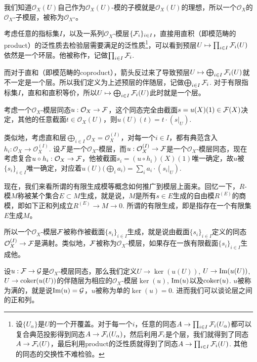 我们知道$\mathcal{O}_X(U)$自己作为$\mathcal{O}_X(U)$-模的子模就是$\mathcal{O}_X(U)$的理想，所以一个$\mathcal{O}_X$的$\mathcal{O}_X$-子模层，被称为$\mathcal{O}_X$-。

\para 考虑任意的指标集$I$，以及一系列$\mathcal{O}_X$-模层$\{\mathcal{F}_i\}_{i\in I}$，直接用直积（即模范畴的product）的泛性质去检验层需要满足的泛性质\footnote{设$\{U_\alpha\}$是$U$的一个开覆盖。对于每一个$i$，任意的同态$A\to \prod_{i\in I}\mathcal{F}_i(U_\alpha)$都可以复合典范投影得到同态$A\to \mathcal{F}_i(U_\alpha)$，然后利用$\mathcal{F}_i$是个层，我们就得到了同态$A\to \mathcal{F}_i(U)$，最后利用product的泛性质就得到了同态$A\to \prod_{i\in I}\mathcal{F}_i(U)$. 其他的同态的交换性不难检验。}，可以看到预层$U\mapsto \prod_{i\in I}\mathcal{F}_i(U)$依然是一个环层。他被称作，记做$\prod_{i\in I}\mathcal{F}_i$.

而对于直和（即模范畴的coproduct），箭头反过来了导致预层$U\mapsto \bigoplus_{i\in I}\mathcal{F}_i(U)$就不一定是一个层。所以我们定义为上述预层的伴随层，记做$\bigoplus_{i\in I}\mathcal{F}_i$. 对于有限指标集$I$，直和和直积等价，所以$U\mapsto \bigoplus_{i\in I}\mathcal{F}_i(U)$此时就是一个层。

\para 考虑一个$\mathcal{O}_X$-模层同态$u:\mathcal{O}_X\to \mathcal{F}$，这个同态完全由截面$s=u(X)(1)\in \mathcal{F}(X)$决定，其他的任意截面$t\in \mathcal{O}_X(U)$，则$u(U)(t)=t\cdot (s|_U)$.

类似地，考虑直和层$\bigoplus_{i\in I}\mathcal{O}_X=\mathcal{O}_X^{(I)}$，对每一个$i\in I$，都有典范含入$h_i:\mathcal{O}_X\to \mathcal{O}_X^{(I)}$. 设$\mathcal{F}$是一个$\mathcal{O}_X$-模层，而$u:\mathcal{O}_X^{(I)}\to \mathcal{F}$是一个$\mathcal{O}_X$-模层同态，现在考虑复合$u\circ h_i:\mathcal{O}_X\to \mathcal{F}$，他被截面$s_i=(u\circ h_i)(X)(1)$唯一确定，故$u$被$\{s_i\}_{i\in I}$唯一确定，对应着$u(U)\bigl(\bigoplus_i a_i\bigr)=\sum_i a_i\cdot (s_i|_U)$.

\para 现在，我们来看所谓的有限生成模等概念如何推广到模层上面来。回忆一下，$R$-模$M$称被某个集合$E\subset M$生成，就是说，$M$是所有$s\in E$生成的自由模$R^{(E)}$的商模，即如下正和列成立$R^{(E)}\to M \to 0$. 所谓的有限生成，即是指存在一个有限集$E$生成$M$。

所以一个$\mathcal{O}_X$-模层$\mathcal{F}$被称作被截面$\{s_i\}_{i\in I}$生成，就是说由截面$\{s_i\}_{i\in I}$定义的同态$\mathcal{O}_X^{(I)}\to \mathcal{F}$是满射。类似地，$\mathcal{F}$被称为$\mathcal{O}_X$-模层，如果存在一族有限截面$\{s_i\}_{i\in I}$生成他。

\para 设$u:\mathcal{F}\to \mathcal{G}$是$\mathcal{O}_X$-模层同态，那么我们定义$U\to \ker(u(U))$, $U\to \operatorname{Im}(u(U))$, $U\to \operatorname{coker}(u(U))$的伴随层为相应的$\mathcal{O}_X$-模层$\ker(u)$, $\operatorname{Im}(u)$以及$\operatorname{coker}(u)$. $u$被称为满的，就是说$\operatorname{Im}(u)=\mathcal{G}$，$u$被称为单的$\ker(u)=0$. 进而我们可以谈论层之间的正和列。

